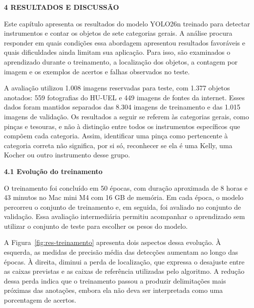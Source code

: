 \begingroup
\justifying
\setlength{\parindent}{1.25cm}
\setlength{\parskip}{0pt}
\setlength{\emergencystretch}{2em}
\onehalfspacing
\renewcommand{\tablename}{Tabela}
{}
\noindent\textbf{4 RESULTADOS E DISCUSSÃO}\par
\nobreak\vspace{\baselineskip}\nobreak

Este capítulo apresenta os resultados do modelo YOLO26n treinado para detectar instrumentos e contar os objetos de sete categorias gerais. A análise procura responder em quais condições essa abordagem apresentou resultados favoráveis e quais dificuldades ainda limitam sua aplicação. Para isso, são examinados o aprendizado durante o treinamento, a localização dos objetos, a contagem por imagem e os exemplos de acertos e falhas observados no teste.

A avaliação utilizou 1.008 imagens reservadas para teste, com 1.377 objetos anotados: 559 fotografias do HU-UEL e 449 imagens de fontes da internet. Esses dados foram mantidos separados das 8.304 imagens de treinamento e das 1.015 imagens de validação. Os resultados a seguir se referem às categorias gerais, como pinças e tesouras, e não à distinção entre todos os instrumentos específicos que compõem cada categoria. Assim, identificar uma pinça como pertencente à categoria correta não significa, por si só, reconhecer se ela é uma Kelly, uma Kocher ou outro instrumento desse grupo.

\vspace{\baselineskip}
{}
\noindent\textbf{4.1 Evolução do treinamento}\par
\nobreak\vspace{\baselineskip}\nobreak

O treinamento foi concluído em 50 épocas, com duração aproximada de 8 horas e 43 minutos no Mac mini M4 com 16 GB de memória. Em cada época, o modelo percorreu o conjunto de treinamento e, em seguida, foi avaliado no conjunto de validação. Essa avaliação intermediária permitiu acompanhar o aprendizado sem utilizar o conjunto de teste para escolher os pesos do modelo.

A Figura~\ref{fig:res-treinamento} apresenta dois aspectos dessa evolução. À esquerda, as medidas de precisão média das detecções aumentam ao longo das épocas. À direita, diminui a perda de localização, que expressa o desajuste entre as caixas previstas e as caixas de referência utilizadas pelo algoritmo. A redução dessa perda indica que o treinamento passou a produzir delimitações mais próximas das anotações, embora ela não deva ser interpretada como uma porcentagem de acertos.

